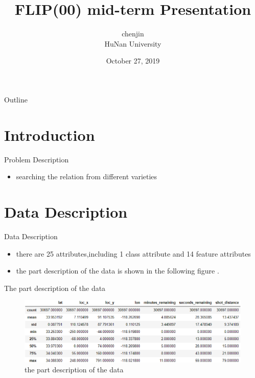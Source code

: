 \documentclass[
 size=14pt,
 paper=smartboard, %
 mode=present, %
 display=slides, %
style=tuliplab,
pauseslide,
fleqn,leqno]{powerdot}
\title{FLIP(00) mid-term Presentation}
\author{
chenjin
\\
HuNan University 
}
\date{October 27, 2019}
\begin{document}
\maketitle 

\begin{slide}[toc=,bm=]{Outline}
\tableofcontents[content=sections]
\end{slide}

\section{Introduction}

\begin{slide}{Problem Description}
  \begin{itemize}
    \item  searching the relation from different varieties 
  \end{itemize}
\end{slide}


\section{Data Description}


\begin{slide}{Data Description}
\begin{itemize}
\item there are 25 attributes,including 1 class attribute and 14 feature attributes
\item the part description of the data is shown in the following figure .
\end{itemize}
\end{slide}

\begin{slide}{The part description of the data}
	\vspace*{10pt}
	\begin{figure}[htbp]
		\centering
		\includegraphics[scale=0.4]{1.eps}
		\caption{the part description of the data}
	\end{figure}
\end{slide}
\end{document}
